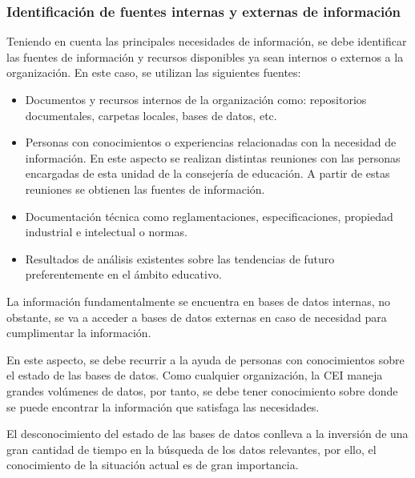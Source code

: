 \subsubsection{Identificación de fuentes internas y externas de información}

Teniendo en cuenta las principales necesidades de información, se debe identificar las fuentes de información y recursos disponibles ya sean internos o externos a la organización. En este caso, se utilizan las siguientes fuentes:
\begin{itemize}
	\item Documentos y recursos internos de la organización como: repositorios documentales, carpetas locales, bases de datos, etc.
	\item Personas con conocimientos o experiencias relacionadas con la necesidad de información. En este aspecto se realizan distintas reuniones con las personas encargadas de esta unidad de la consejería de educación. A partir de estas reuniones se obtienen las fuentes de información.
	\item Documentación técnica como reglamentaciones, especificaciones, propiedad industrial e intelectual o normas.
	\item Resultados de análisis existentes sobre las tendencias de futuro preferentemente en el ámbito educativo.
\end{itemize}


La información fundamentalmente se encuentra en bases de datos internas, no obstante, se va a acceder a bases de datos externas en caso de necesidad para cumplimentar la información. 

En este aspecto, se debe recurrir a la ayuda de personas con conocimientos sobre el estado de las bases de datos. Como cualquier organización, la CEI maneja grandes volúmenes de datos, por tanto, se debe tener conocimiento sobre donde se puede encontrar la información que satisfaga las necesidades. 

El desconocimiento del estado de las bases de datos conlleva a la inversión de una gran cantidad de tiempo en la búsqueda de los datos relevantes, por ello, el conocimiento de la situación actual es de gran importancia.

